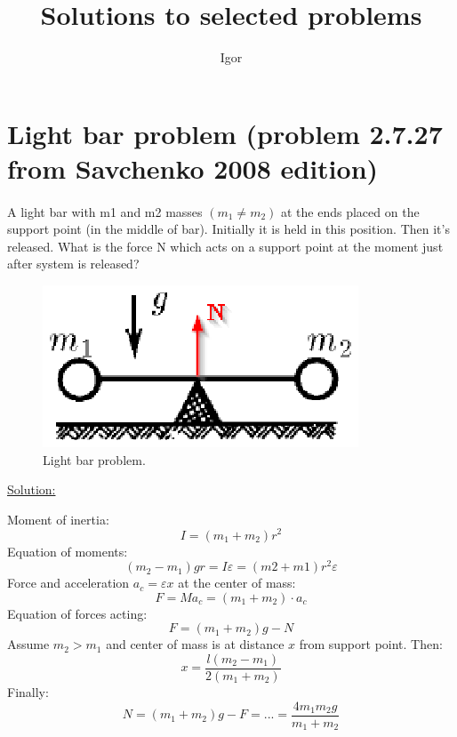\documentclass[12pt, letterpaper]{article}
\begin{document}
\title{Solutions to selected problems}
\author{Igor}
\maketitle

\tableofcontents
\newpage

\section{Light bar problem (problem 2.7.27 from Savchenko 2008 edition)}
\paragraph{}
A light bar with m1 and m2 masses $(m_1 \neq m_2)$ at the ends placed on the support point (in the middle of  bar). Initially it is held in this position. Then it's released.
What is the force N which acts on a support point at the moment just after system is released?

\begin{figure}[!htbp]
	\centering
	\includegraphics[totalheight=2cm]{./images/LightBarProblem.eps}
	\caption{Light bar problem.}
	\label{fig:verticalcell}
\end{figure}

\noindent\underline{\large Solution:}
\vspace{0.2in}
\begin{addmargin}[1em]{2em}
Moment of inertia:
$$I=(m_1+m_2)r^2$$
Equation of moments:
$$(m_2-m_1)gr=I\varepsilon=(m2+m1)r^2\varepsilon$$
Force and acceleration $a_c=\varepsilon x$ at the center of mass:
$$F=Ma_c=(m_1+m_2) \cdot a_c$$
Equation of forces acting:
$$F=(m_1+m_2)g-N$$
Assume $m_2>m_1$ and center of mass is at distance $x$ from support point. Then: $$x=\frac {l(m_2-m_1)} {2(m_1+m_2)}$$
Finally: $$N=(m_1+m_2)g-F=...=\frac {4m_1m_2g} {m_1+m_2}$$
\end{addmargin}
\end{document}
